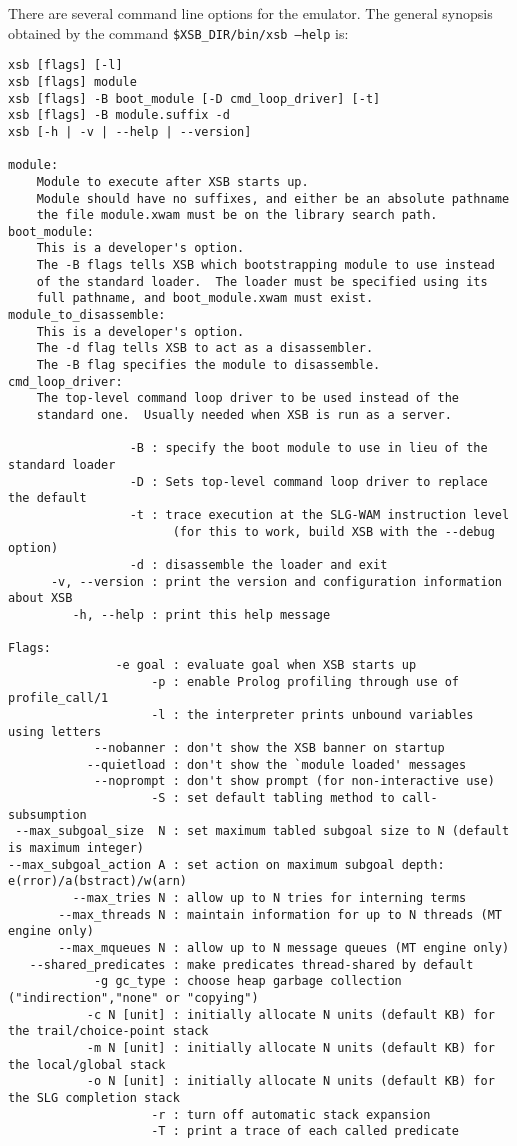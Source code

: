 There are several command line options for the emulator. The general 
synopsis obtained by the command {\tt \$XSB\_DIR/bin/xsb --help} is: 
{\small 
\begin{verbatim}
xsb [flags] [-l] 
xsb [flags] module
xsb [flags] -B boot_module [-D cmd_loop_driver] [-t] 
xsb [flags] -B module.suffix -d
xsb [-h | -v | --help | --version]

module:
    Module to execute after XSB starts up.
    Module should have no suffixes, and either be an absolute pathname
    the file module.xwam must be on the library search path.
boot_module:
    This is a developer's option.
    The -B flags tells XSB which bootstrapping module to use instead
    of the standard loader.  The loader must be specified using its
    full pathname, and boot_module.xwam must exist.
module_to_disassemble:
    This is a developer's option.
    The -d flag tells XSB to act as a disassembler.
    The -B flag specifies the module to disassemble.
cmd_loop_driver:
    The top-level command loop driver to be used instead of the
    standard one.  Usually needed when XSB is run as a server.

                 -B : specify the boot module to use in lieu of the standard loader
                 -D : Sets top-level command loop driver to replace the default
                 -t : trace execution at the SLG-WAM instruction level
                       (for this to work, build XSB with the --debug option)
                 -d : disassemble the loader and exit
      -v, --version : print the version and configuration information about XSB
         -h, --help : print this help message

Flags: 
               -e goal : evaluate goal when XSB starts up
                    -p : enable Prolog profiling through use of profile_call/1
                    -l : the interpreter prints unbound variables using letters
            --nobanner : don't show the XSB banner on startup
           --quietload : don't show the `module loaded' messages
            --noprompt : don't show prompt (for non-interactive use)
                    -S : set default tabling method to call-subsumption
 --max_subgoal_size  N : set maximum tabled subgoal size to N (default is maximum integer)
--max_subgoal_action A : set action on maximum subgoal depth: e(rror)/a(bstract)/w(arn)
         --max_tries N : allow up to N tries for interning terms
       --max_threads N : maintain information for up to N threads (MT engine only)
       --max_mqueues N : allow up to N message queues (MT engine only)
   --shared_predicates : make predicates thread-shared by default
            -g gc_type : choose heap garbage collection ("indirection","none" or "copying")
           -c N [unit] : initially allocate N units (default KB) for the trail/choice-point stack
           -m N [unit] : initially allocate N units (default KB) for the local/global stack
           -o N [unit] : initially allocate N units (default KB) for the SLG completion stack
                    -r : turn off automatic stack expansion
                    -T : print a trace of each called predicate


\end{verbatim}}
